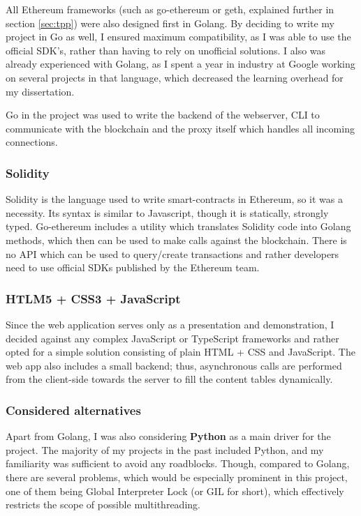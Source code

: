 All Ethereum frameworks (such as go-ethereum or geth, explained further in section \ref{sec:tpp}) were also designed first in Golang. By deciding to write my project in Go as well, I ensured maximum compatibility, as I was able to use the official SDK's, rather than having to rely on unofficial solutions. I also was already experienced with Golang, as I spent a year in industry at Google working on several projects in that language, which decreased the learning overhead for my dissertation.

Go in the project was used to write the backend of the webserver, CLI to communicate with the blockchain and the proxy itself which handles all incoming connections.
\subsubsection{Solidity}
Solidity \cite{dannen2017introducing} is the language used to write smart-contracts in Ethereum, so it was a necessity. Its syntax is similar to Javascript, though it is statically, strongly typed. Go-ethereum includes a utility which translates Solidity code into Golang methods, which then can be used to make calls against the blockchain. There is no API which can be used to query/create transactions and rather developers need to use official SDKs published by the Ethereum team.
\subsubsection{HTLM5 + CSS3 + JavaScript}
Since the web application serves only as a presentation and demonstration, I decided against any complex JavaScript or TypeScript frameworks and rather opted for a simple solution consisting of plain HTML + CSS and JavaScript. The web app also includes a small backend; thus, asynchronous calls are performed from the client-side towards the server to fill the content tables dynamically.
\subsubsection{Considered alternatives}
Apart from Golang, I was also considering \textbf{Python} as a main driver for the project. The majority of my projects in the past included Python, and my familiarity was sufficient to avoid any roadblocks. Though, compared to Golang, there are several problems, which would be especially prominent in this project, one of them being Global Interpreter Lock\cite{beazley2010understanding} (or GIL for short), which effectively restricts the scope of possible multithreading.

